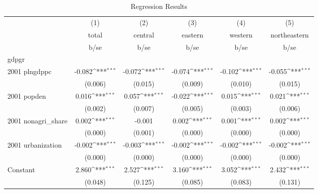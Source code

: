 \begin{table}[htbp]\centering
\def\sym#1{\ifmmode^{#1}\else\(^{#1}\)\fi}
\caption{Regression Results}
\begin{tabular}{l*{5}{c}}
\hline\hline
                    &\multicolumn{1}{c}{(1)}&\multicolumn{1}{c}{(2)}&\multicolumn{1}{c}{(3)}&\multicolumn{1}{c}{(4)}&\multicolumn{1}{c}{(5)}\\
                    &\multicolumn{1}{c}{total}&\multicolumn{1}{c}{central}&\multicolumn{1}{c}{eastern}&\multicolumn{1}{c}{western}&\multicolumn{1}{c}{northeastern}\\
                    &        b/se         &        b/se         &        b/se         &        b/se         &        b/se         \\
\hline
gdpgr               &                     &                     &                     &                     &                     \\
2001 plngdppc       &      -0.082\sym{***}&      -0.072\sym{***}&      -0.074\sym{***}&      -0.102\sym{***}&      -0.055\sym{***}\\
                    &     (0.006)         &     (0.015)         &     (0.009)         &     (0.010)         &     (0.015)         \\
2001 popden         &       0.016\sym{***}&       0.057\sym{***}&      -0.022\sym{***}&       0.015\sym{***}&       0.021\sym{***}\\
                    &     (0.002)         &     (0.007)         &     (0.005)         &     (0.003)         &     (0.006)         \\
2001 nonagri\_share  &       0.002\sym{***}&      -0.001         &       0.002\sym{***}&       0.001\sym{***}&       0.002\sym{***}\\
                    &     (0.000)         &     (0.001)         &     (0.000)         &     (0.000)         &     (0.000)         \\
2001 urbanization   &      -0.002\sym{***}&      -0.003\sym{***}&      -0.002\sym{***}&      -0.002\sym{***}&      -0.002\sym{***}\\
                    &     (0.000)         &     (0.000)         &     (0.000)         &     (0.000)         &     (0.000)         \\
Constant            &       2.860\sym{***}&       2.527\sym{***}&       3.160\sym{***}&       3.052\sym{***}&       2.432\sym{***}\\
                    &     (0.048)         &     (0.125)         &     (0.085)         &     (0.083)         &     (0.131)         \\

\end{tabular}
\end{table}
